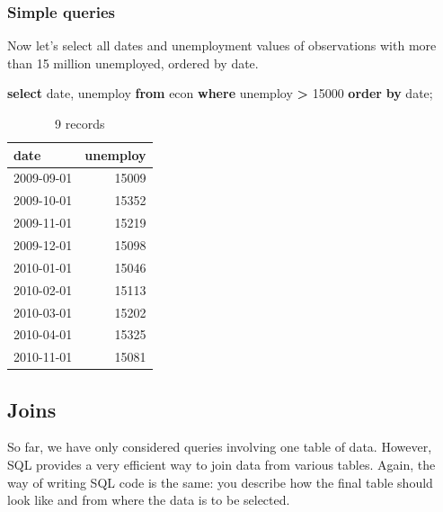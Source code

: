 \documentclass[
  12pt,
]{style/krantz}
\newenvironment{Shaded}{\begin{snugshade}}{\end{snugshade}}
\newcommand{\DataTypeTok}[1]{\textcolor[rgb]{0.13,0.29,0.53}{#1}}
\newcommand{\DecValTok}[1]{\textcolor[rgb]{0.00,0.00,0.81}{#1}}
\newcommand{\KeywordTok}[1]{\textcolor[rgb]{0.13,0.29,0.53}{\textbf{#1}}}
\newcommand{\NormalTok}[1]{#1}
\newcommand{\OperatorTok}[1]{\textcolor[rgb]{0.81,0.36,0.00}{\textbf{#1}}}
\begin{document}
\hypertarget{simple-queries}{%
\subsubsection{Simple queries}\label{simple-queries}}

Now let's select all dates and unemployment values of observations with more than 15 million unemployed, ordered by date.

\begin{Shaded}
\begin{Highlighting}[]
\KeywordTok{select} \DataTypeTok{date}\NormalTok{, }
\NormalTok{unemploy }\KeywordTok{from}\NormalTok{ econ }
\KeywordTok{where}\NormalTok{ unemploy }\OperatorTok{\textgreater{}} \DecValTok{15000}
\KeywordTok{order} \KeywordTok{by} \DataTypeTok{date}\NormalTok{;}
\end{Highlighting}
\end{Shaded}

\begin{table}

\caption{\label{tab:unnamed-chunk-63}9 records}
\centering
\begin{tabular}[t]{l|r}
\hline
date & unemploy\\
\hline
2009-09-01 & 15009\\
\hline
2009-10-01 & 15352\\
\hline
2009-11-01 & 15219\\
\hline
2009-12-01 & 15098\\
\hline
2010-01-01 & 15046\\
\hline
2010-02-01 & 15113\\
\hline
2010-03-01 & 15202\\
\hline
2010-04-01 & 15325\\
\hline
2010-11-01 & 15081\\
\hline
\end{tabular}
\end{table}

\hypertarget{joins}{%
\subsection{Joins}\label{joins}}

So far, we have only considered queries involving one table of data. However, SQL provides a very efficient way to join data from various tables. Again, the way of writing SQL code is the same: you describe how the final table should look like and from where the data is to be selected.
\end{document}
